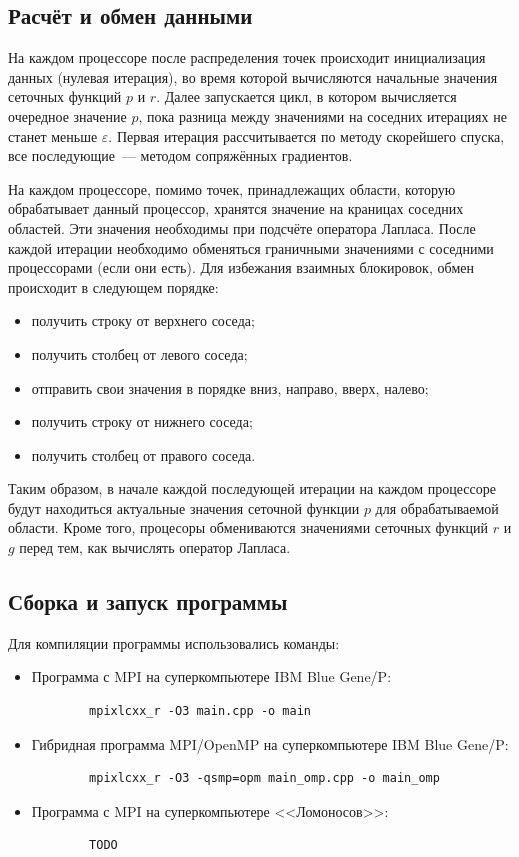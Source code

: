 \documentclass[11pt]{article}
\numberwithin{equation}{section}
\theoremstyle{plain}
\theoremstyle{definition}
\begin{document}
\subsection{Расчёт и обмен данными}

На каждом процессоре после распределения точек происходит инициализация
данных (нулевая итерация), во время которой вычисляются начальные значения
сеточных функций $p$ и $r$. Далее запускается цикл, в котором вычисляется
очередное значение $p$, пока разница между значениями на соседних итерациях
не станет меньше $\varepsilon$. Первая итерация рассчитывается по методу
скорейшего спуска, все последующие~--- методом сопряжённых градиентов.

На каждом процессоре, помимо точек, принадлежащих области, которую обрабатывает
данный процессор, хранятся значение на краницах соседних областей. Эти
значения необходимы при подсчёте оператора Лапласа.
После каждой итерации необходимо обменяться граничными значениями с соседними
процессорами (если они есть). Для избежания взаимных блокировок, обмен
происходит в следующем порядке:
\begin{itemize}
    \item получить строку от верхнего соседа;
    \item получить столбец от левого соседа;
    \item отправить свои значения в порядке вниз, направо, вверх, налево;
    \item получить строку от нижнего соседа;
    \item получить столбец от правого соседа.
\end{itemize}

Таким образом, в начале каждой последующей итерации на каждом процессоре будут
находиться актуальные значения сеточной функции $p$ для обрабатываемой области.
Кроме того, процесоры обмениваются значениями сеточных функций $r$ и $g$ перед
тем, как вычислять оператор Лапласа.

\subsection{Сборка и запуск программы}

Для компиляции программы использовались команды:
\begin{itemize}
    \item Программа с MPI на суперкомпьютере IBM Blue Gene/P:
        \begin{verbatim}
        mpixlcxx_r -O3 main.cpp -o main
        \end{verbatim}
    \item Гибридная программа MPI/OpenMP на суперкомпьютере IBM Blue Gene/P:
        \begin{verbatim}
        mpixlcxx_r -O3 -qsmp=opm main_omp.cpp -o main_omp
        \end{verbatim}
    \item Программа с MPI на суперкомпьютере <<Ломоносов>>:
        \begin{verbatim}
        TODO
        \end{verbatim}
\end{itemize}
\end{document}

